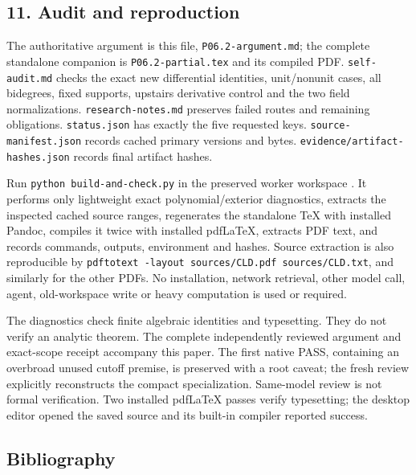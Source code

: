 \documentclass[
  11pt,
]{article}
\begin{document}
\subsection{11. Audit and reproduction}\label{audit-and-reproduction}

The authoritative argument is this file, \texttt{P06.2-argument.md}; the
complete standalone companion is \texttt{P06.2-partial.tex} and its
compiled PDF. \texttt{self-audit.md} checks the exact new differential
identities, unit/nonunit cases, all bidegrees, fixed supports, upstairs
derivative control and the two field normalizations.
\texttt{research-notes.md} preserves failed routes and remaining
obligations. \texttt{status.json} has exactly the five requested keys.
\texttt{source-manifest.json} records cached primary versions and bytes.
\texttt{evidence/artifact-hashes.json} records final artifact hashes.

Run \texttt{python\ build-and-check.py} in the preserved worker
workspace
. It performs
only lightweight exact polynomial/exterior diagnostics, extracts the
inspected cached source ranges, regenerates the standalone TeX with
installed Pandoc, compiles it twice with installed pdfLaTeX, extracts
PDF text, and records commands, outputs, environment and hashes. Source
extraction is also reproducible by
\texttt{pdftotext\ -layout\ sources/CLD.pdf\ sources/CLD.txt}, and
similarly for the other PDFs. No installation, network retrieval, other
model call, agent, old-workspace write or heavy computation is used or
required.

The diagnostics check finite algebraic identities and typesetting. They
do not verify an analytic theorem. The complete independently
reviewed argument and exact-scope receipt accompany this paper.
The first native PASS, containing an overbroad unused cutoff
premise, is preserved with a root caveat; the fresh review explicitly
reconstructs the compact specialization. Same-model review is not
formal verification. Two installed pdfLaTeX passes verify typesetting;
the desktop editor opened the saved source and its built-in
compiler reported success.

\subsection{Bibliography}\label{bibliography}
\end{document}
